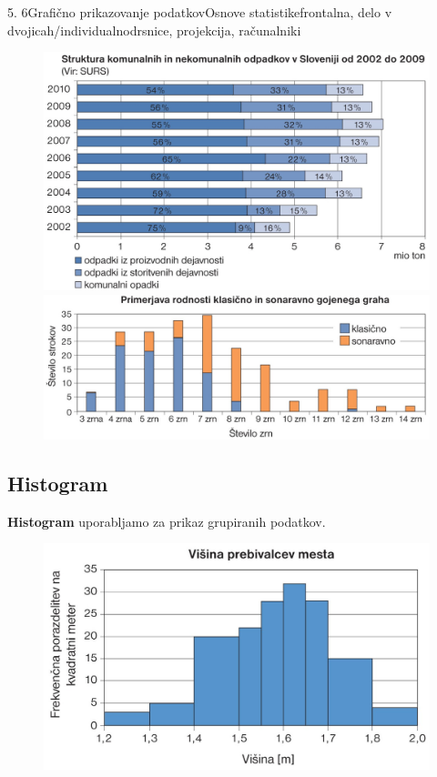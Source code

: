 \begin{priprava}{5. 6}{}{Grafično prikazovanje podatkov}{Osnove statistike}{frontalna, delo v dvojicah/individualno}{drsnice, projekcija, računalniki}
\begin{figure}[H]
            \includegraphics[scale=0.22]{../../Slike_in_skice/1097.jpg} 
            \includegraphics[scale=0.21]{../../Slike_in_skice/1096.jpg}
            
        \end{figure}
    




\newpage

\subsection*{Histogram}

    \textbf{Histogram} uporabljamo za prikaz grupiranih podatkov. 

        \begin{figure}[H]
            \includegraphics[scale=0.33]{../../Slike_in_skice/1098.jpg}
        \end{figure}



\end{priprava}
